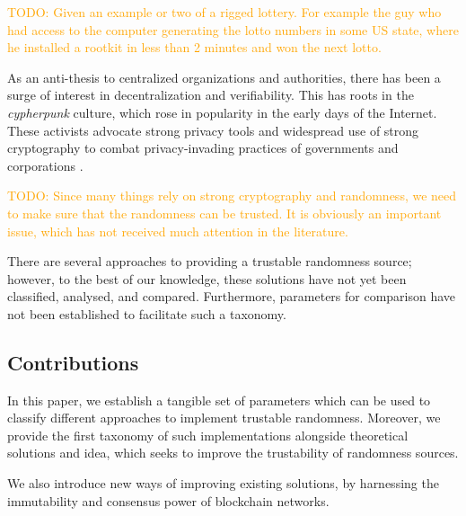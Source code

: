 \textcolor{orange}{TODO: Given an example or two of a rigged lottery. For example the guy who had access to the computer generating the lotto numbers in some US state, where he installed a rootkit in less than 2 minutes and won the next lotto.}

As an anti-thesis to centralized organizations and authorities, there has been a surge of interest in decentralization and verifiability. This has roots in the \emph{cypherpunk} culture, which rose in popularity in the early days of the Internet. These activists advocate strong privacy tools and widespread use of strong cryptography to combat privacy-invading practices of governments and corporations .

\textcolor{orange}{TODO: Since many things rely on strong cryptography and randomness, we need to make sure that the randomness can be trusted. It is obviously an important issue, which has not received much attention in the literature.}


There are several approaches to providing a trustable randomness source; however, to the best of our knowledge, these solutions have not yet been classified, analysed, and compared.
Furthermore, parameters for comparison have not been established to facilitate such a taxonomy.

\subsection*{Contributions}\label{subsec:contributions}
In this paper, we establish a tangible set of parameters which can be used to classify different approaches to implement trustable randomness.
Moreover, we provide the first taxonomy of such implementations alongside theoretical solutions and idea, which seeks to improve the trustability of randomness sources.

We also introduce new ways of improving existing solutions, by harnessing the immutability and consensus power of blockchain networks.


